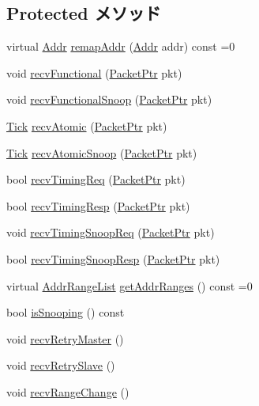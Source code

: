 \subsection*{Protected メソッド}
\begin{DoxyCompactItemize}
\item 
virtual \hyperlink{base_2types_8hh_af1bb03d6a4ee096394a6749f0a169232}{Addr} \hyperlink{classAddrMapper_a07fe2c0e12fc8be8a245306df09f1b2d}{remapAddr} (\hyperlink{base_2types_8hh_af1bb03d6a4ee096394a6749f0a169232}{Addr} addr) const =0
\item 
void \hyperlink{classAddrMapper_aeefa907fb6d6a787e6dab90e8138ea90}{recvFunctional} (\hyperlink{classPacket}{PacketPtr} pkt)
\item 
void \hyperlink{classAddrMapper_a284dfb90c168233c9d416bc07de8fefe}{recvFunctionalSnoop} (\hyperlink{classPacket}{PacketPtr} pkt)
\item 
\hyperlink{base_2types_8hh_a5c8ed81b7d238c9083e1037ba6d61643}{Tick} \hyperlink{classAddrMapper_a5f0b4c4a94f6b0053f9d7a4eb9c2518a}{recvAtomic} (\hyperlink{classPacket}{PacketPtr} pkt)
\item 
\hyperlink{base_2types_8hh_a5c8ed81b7d238c9083e1037ba6d61643}{Tick} \hyperlink{classAddrMapper_a886d584c81ee4e398ff8069907f6e1a5}{recvAtomicSnoop} (\hyperlink{classPacket}{PacketPtr} pkt)
\item 
bool \hyperlink{classAddrMapper_a3344d9dd0f83257feab5424e761f31c6}{recvTimingReq} (\hyperlink{classPacket}{PacketPtr} pkt)
\item 
bool \hyperlink{classAddrMapper_a482dba5588f4bee43e498875a61e5e0b}{recvTimingResp} (\hyperlink{classPacket}{PacketPtr} pkt)
\item 
void \hyperlink{classAddrMapper_aff3031c56fc4947a19695c868bb8233e}{recvTimingSnoopReq} (\hyperlink{classPacket}{PacketPtr} pkt)
\item 
bool \hyperlink{classAddrMapper_a9b643d565edc21dac11ce15a560238a7}{recvTimingSnoopResp} (\hyperlink{classPacket}{PacketPtr} pkt)
\item 
virtual \hyperlink{classstd_1_1list}{AddrRangeList} \hyperlink{classAddrMapper_a6e967f8921e80748eb2be35b6b481a7e}{getAddrRanges} () const =0
\item 
bool \hyperlink{classAddrMapper_a5ce11b7a254d3cb756d94568f7cbc25d}{isSnooping} () const 
\item 
void \hyperlink{classAddrMapper_a74fc0d5bf99b08c9899269e3dd7fab6a}{recvRetryMaster} ()
\item 
void \hyperlink{classAddrMapper_a2292f62803fe220e9629886f24aae91a}{recvRetrySlave} ()
\item 
void \hyperlink{classAddrMapper_aecf310a01b533ae8700eccac2cf20480}{recvRangeChange} ()
\end{DoxyCompactItemize}
